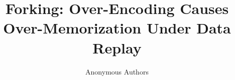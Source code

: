 \documentclass{article}
\title{Forking: Over-Encoding Causes\\Over-Memorization Under Data Replay}
\author{Anonymous Authors}
\begin{document}
\maketitle
\begin{abstract}

\end{abstract}








\clearpage
\appendix


\end{document}

